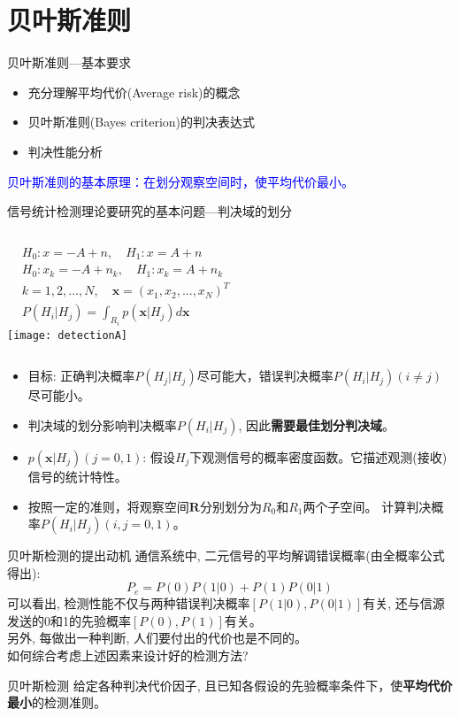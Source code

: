 \section{贝叶斯准则}

\begin{frame}{贝叶斯准则---基本要求}
\begin{itemize}
	\item 充分理解平均代价(Average risk)的概念
	\item 贝叶斯准则(Bayes criterion)的判决表达式
	\item 判决性能分析
\end{itemize}

\bigskip
\textcolor{blue}{贝叶斯准则的基本原理：在划分观察空间时，使平均代价最小。}
\end{frame}

\begin{frame}{信号统计检测理论要研究的基本问题---判决域的划分}
\begin{columns}
	\begin{align*}
	&H_0: x=-A+n,\quad H_1: x=A+n\\
	&H_0: x_k=-A+n_k,\quad H_1: x_k=A+n_k\\
	&k=1,2,\dots,N,\quad \bm{x}=(x_1,x_2,\dots,x_N)^{T}\\
	&P(H_i|H_j)=\int_{R_i}p(\bm{x}|H_j)d\bm{x}
	\end{align*}
	\texttt{[image: detectionA]}
\end{columns}
\begin{itemize}
	\item 目标: 正确判决概率$P(H_j|H_j)$尽可能大，错误判决概率$P(H_i|H_j)(i\ne j)$尽可能小。
	\item 判决域的划分影响判决概率$P(H_i|H_j)$, 因此\textbf{需要最佳划分判决域}。
	\item $p(\bm{x}|H_j)(j=0,1)$: 假设$H_j$下观测信号的概率密度函数。它描述观测(接收)信号的统计特性。
	\item 按照一定的准则，将观察空间$\bm{R}$分别划分为$R_0$和$R_1$两个子空间。
	计算判决概率$P(H_i|H_j)(i,j=0,1)$。	
\end{itemize}
\end{frame}

\begin{frame}{贝叶斯检测的提出动机}
通信系统中, 二元信号的平均解调错误概率(由全概率公式得出):
\[ P_e=P(0)P(1|0)+P(1)P(0|1)\]
可以看出, 检测性能不仅与两种错误判决概率$[P(1|0),P(0|1)]$有关, 还与信源发送的0和1的先验概率$[P(0),P(1)]$有关。\\
另外, 每做出一种判断, 人们要付出的代价也是不同的。\\
如何综合考虑上述因素来设计好的检测方法?
\begin{block}{贝叶斯检测}
	给定各种判决代价因子, 且已知各假设的先验概率条件下，使\textbf{平均代价最小}的检测准则。
\end{block}
\end{frame}

